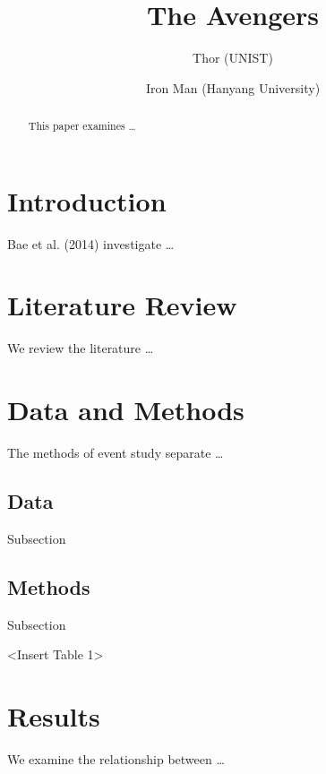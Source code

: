 \documentclass[
  12pt,
]{article}
\title{The Avengers}
\author{Thor (UNIST) \and Iron Man (Hanyang University)}
\date{}
\begin{document}
\maketitle
\begin{abstract}
This paper examines \ldots{}
\end{abstract}

\setlength{\parindent}{1cm}

\hypertarget{introduction}{%
\section{Introduction}\label{introduction}}

Bae et al. (2014) investigate \ldots{}

\hypertarget{literature-review}{%
\section{Literature Review}\label{literature-review}}

We review the literature \ldots{}

\hypertarget{data-and-methods}{%
\section{Data and Methods}\label{data-and-methods}}

The methods of event study separate \ldots{}

\hypertarget{data}{%
\subsection{Data}\label{data}}

Subsection

\hypertarget{methods}{%
\subsection{Methods}\label{methods}}

Subsection

\begin{center}
<Insert Table 1>
\end{center}

\hypertarget{results}{%
\section{Results}\label{results}}

We examine the relationship between \ldots{}
\end{document}

